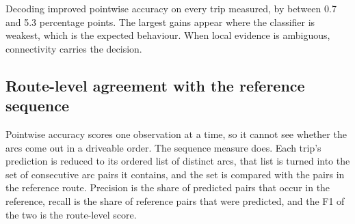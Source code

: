 \documentclass[11pt,a4paper]{article}
\begin{document}
\begin{table}[H]
\centering
\caption{Pointwise accuracy with and without sequential decoding, on development trips.}
\label{tab:decoder}
\small
{}
\end{table}

Decoding improved pointwise accuracy on every trip measured, by between 0.7 and 5.3 percentage points. The largest gains appear where the classifier is weakest, which
is the expected behaviour. When local evidence is ambiguous, connectivity carries the decision.

\subsection{Route-level agreement with the reference sequence}

Pointwise accuracy scores one observation at a time, so it cannot see whether the arcs come out in a
driveable order. The sequence measure does. Each trip's prediction is reduced to its ordered list of
distinct arcs, that list is turned into the set of consecutive arc pairs it contains, and the set is
compared with the pairs in the reference route. Precision is the share of predicted pairs that occur
in the reference, recall is the share of reference pairs that were predicted, and the F1 of the two is
the route-level score.
\end{document}
